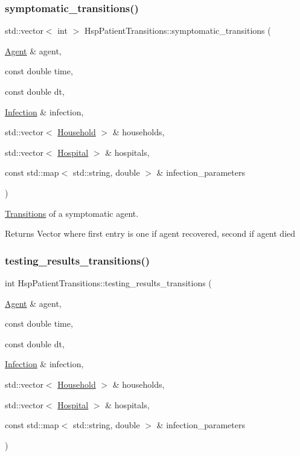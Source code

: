 \subsubsection{\texorpdfstring{symptomatic\+\_\+transitions()}{symptomatic\_transitions()}}
{\footnotesize\ttfamily std\+::vector$<$ int $>$ Hsp\+Patient\+Transitions\+::symptomatic\+\_\+transitions (\begin{DoxyParamCaption}\item[{\hyperlink{classAgent}{Agent} \&}]{agent,  }\item[{const double}]{time,  }\item[{const double}]{dt,  }\item[{\hyperlink{classInfection}{Infection} \&}]{infection,  }\item[{std\+::vector$<$ \hyperlink{classHousehold}{Household} $>$ \&}]{households,  }\item[{std\+::vector$<$ \hyperlink{classHospital}{Hospital} $>$ \&}]{hospitals,  }\item[{const std\+::map$<$ std\+::string, double $>$ \&}]{infection\+\_\+parameters }\end{DoxyParamCaption})}



\hyperlink{classTransitions}{Transitions} of a symptomatic agent. 

\begin{DoxyReturn}{Returns}
Vector where first entry is one if agent recovered, second if agent died 
\end{DoxyReturn}
\mbox{\label{classHspPatientTransitions_a90b603dcad14fa9a76acaa098a210fae}} 
\subsubsection{\texorpdfstring{testing\+\_\+results\+\_\+transitions()}{testing\_results\_transitions()}}
{\footnotesize\ttfamily int Hsp\+Patient\+Transitions\+::testing\+\_\+results\+\_\+transitions (\begin{DoxyParamCaption}\item[{\hyperlink{classAgent}{Agent} \&}]{agent,  }\item[{const double}]{time,  }\item[{const double}]{dt,  }\item[{\hyperlink{classInfection}{Infection} \&}]{infection,  }\item[{std\+::vector$<$ \hyperlink{classHousehold}{Household} $>$ \&}]{households,  }\item[{std\+::vector$<$ \hyperlink{classHospital}{Hospital} $>$ \&}]{hospitals,  }\item[{const std\+::map$<$ std\+::string, double $>$ \&}]{infection\+\_\+parameters }\end{DoxyParamCaption})}



